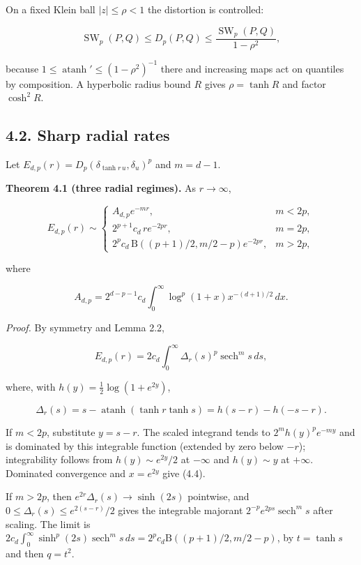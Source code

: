 \documentclass[
  british,
  11pt,
  a4paper,
]{article}
\begin{document}
On a fixed Klein ball \(|z|\leq\rho<1\) the distortion is controlled:

\[
\operatorname{SW}_p(P,Q)\leq D_p(P,Q)
\leq\frac{\operatorname{SW}_p(P,Q)}{1-\rho^2},
\tag{4.2}
\]

because \(1\leq\operatorname{atanh}'\leq(1-\rho^2)^{-1}\) there and
increasing maps act on quantiles by composition. A hyperbolic radius
bound \(R\) gives \(\rho=\tanh R\) and factor \(\cosh^2R\).

\subsection{4.2. Sharp radial rates}\label{sharp-radial-rates}

Let \(E_{d,p}(r)=D_p(\delta_{\tanh r\,u},\delta_u)^p\) and \(m=d-1\).

\textbf{Theorem 4.1 (three radial regimes).} As \(r\to\infty\),

\[
E_{d,p}(r)\sim
\begin{cases}
A_{d,p}e^{-mr},&m<2p,\\
2^{p+1}c_d\,r e^{-2pr},&m=2p,\\
2^pc_d\,\mathrm B((p+1)/2,m/2-p)e^{-2pr},&m>2p,
\end{cases}
\tag{4.3}
\]

where

\[
A_{d,p}=2^{d-p-1}c_d\int_0^\infty\log^p(1+x)x^{-(d+1)/2}\,dx.
\tag{4.4}
\]

\emph{Proof.} By symmetry and Lemma 2.2,

\[
E_{d,p}(r)=2c_d\int_0^\infty\Delta_r(s)^p\operatorname{sech}^m s\,ds,
\tag{4.5}
\]

where, with \(h(y)=\tfrac12\log(1+e^{2y})\),

\[
\Delta_r(s)=s-\operatorname{atanh}(\tanh r\tanh s)
=h(s-r)-h(-s-r).
\tag{4.6}
\]

If \(m<2p\), substitute \(y=s-r\). The scaled integrand tends to
\(2^mh(y)^pe^{-my}\) and is dominated by this integrable function
(extended by zero below \(-r\)); integrability follows from
\(h(y)\sim e^{2y}/2\) at \(-\infty\) and \(h(y)\sim y\) at \(+\infty\).
Dominated convergence and \(x=e^{2y}\) give (4.4).

If \(m>2p\), then \(e^{2r}\Delta_r(s)\to\sinh(2s)\) pointwise, and
\(0\leq\Delta_r(s)\leq e^{2(s-r)}/2\) gives the integrable majorant
\(2^{-p}e^{2ps}\operatorname{sech}^m s\) after scaling. The limit is
\(2c_d\int_0^\infty\sinh^p(2s)\operatorname{sech}^m s\,ds=2^pc_d\mathrm B((p+1)/2,m/2-p)\),
by \(t=\tanh s\) and then \(q=t^2\).
\end{document}

